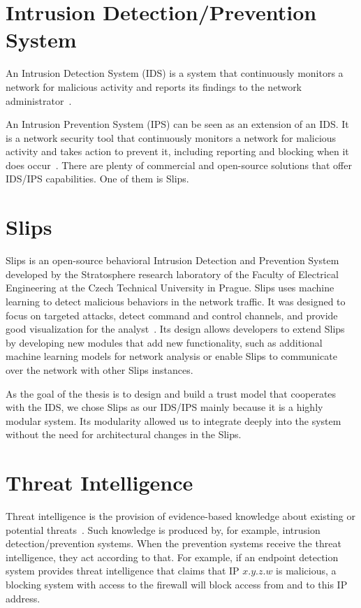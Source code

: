 \section{Intrusion Detection/Prevention System}
\label{sec:intrusion-detection-prevention-system}
An Intrusion Detection System (IDS) is a system that continuously monitors a network for malicious activity and reports its findings to the network administrator~\cite{bace2001intrusion}.

An Intrusion Prevention System (IPS) can be seen as an extension of an IDS. 
It is a network security tool that continuously monitors a network for malicious activity and takes action to prevent it, including reporting and blocking when it does occur~\cite{zhang2004intrusion}.
There are plenty of commercial and open-source solutions that offer IDS/IPS capabilities. One of them is Slips.


\section{Slips}
\label{sec:slips}
Slips is an open-source behavioral Intrusion Detection and Prevention System developed by the Stratosphere research laboratory of the Faculty of Electrical Engineering at the Czech Technical University in Prague.
Slips uses machine learning to detect malicious behaviors in the network traffic. It was designed to focus on targeted attacks, detect command and control channels, and provide good visualization for the analyst~\cite{slips}.
Its design allows developers to extend Slips by developing new modules that add new functionality, such as additional machine learning models for network analysis or enable Slips to communicate over the network with other Slips instances.

As the goal of the thesis is to design and build a trust model that cooperates with the IDS, we chose Slips as our IDS/IPS mainly because it is a highly modular system.
Its modularity allowed us to integrate deeply into the system without the need for architectural changes in the Slips.

\section{Threat Intelligence}
\label{sec:threat-intelligence}
Threat intelligence is the provision of evidence-based knowledge about existing or potential threats~\cite{threatintelligence}.
Such knowledge is produced by, for example, intrusion 
detection/prevention systems.
When the prevention systems receive the threat intelligence, they act according to that.
For example, if an endpoint detection system provides threat intelligence that claims that IP $x.y.z.w$ is malicious, a blocking system with access to the firewall will block access from and to this IP address.

